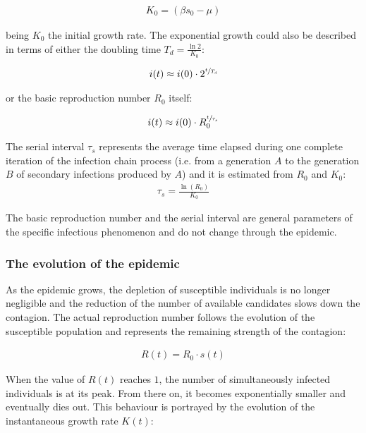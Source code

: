 \documentclass[DIV=12, BCOR=0pt]{scrartcl}  %
\begin{document}
  \begin{align} %
  	K_0 = (\beta s_0 - \mu)
  	\label{eq:sir_K0}
  \end{align}
	
	being $K_0$ the initial growth rate. The exponential growth could also be described in terms of either the doubling time $T_{d} = \frac{\ln 2}{K_0}$:

	\begin{align}
		i(t) \approx i(0) \cdot 2^{\sfrac{t}{T_{d}}}
		\label{eq:sir_growthTd}  %
	\end{align}

	or the basic reproduction number $R_0$ itself:
	
	\begin{align}
		i(t) \approx i(0) \cdot R_0^{\sfrac{t}{\tau_s}}
		\label{eq:sir_growthR0}
	\end{align}

The serial interval $\tau_s$ represents the average time elapsed during one complete iteration of the infection chain process (i.e. from a generation $A$ to the generation $B$ of secondary infections produced by $A$) and it is estimated from $R_0$ and $K_0$: 
	\begin{align}
		\tau_s = \frac{\ln(R_0)}{K_0}
		\label{eq:serial}
	\end{align}

The basic reproduction number and the serial interval are general parameters of the specific infectious phenomenon and do not change through the epidemic.  

  \subsubsection{The evolution of the epidemic}
  As the epidemic grows, the depletion of susceptible individuals is no longer negligible and the reduction of the number of available candidates slows down the contagion.
  The actual reproduction number follows the evolution of the susceptible population and represents the remaining strength of the contagion:
  
  \begin{align}
		R(t) = R_0 \cdot s(t) 
		\label{eq:Rt}
  \end{align}

  When the value of $R(t)$ reaches $1$, the number of simultaneously infected individuals is at its peak. From there on, it becomes exponentially smaller and eventually dies out. 
  This behaviour is portrayed by the evolution of the instantaneous growth rate $K(t)$:
  
\end{document}
